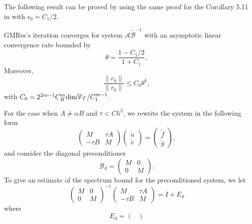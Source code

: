 \documentclass[smallcondensed]{svjour3}
\numberwithin{equation}{section} \numberwithin{table}{section}
\numberwithin{figure}{section}
\numberwithin{algorithm}{section}
\begin{document}
The following result can be proved by using the same proof for the Corollary 5.11 in \cite{bansch2011preconditioning} with $\epsilon_0 = C_1/2$.

\begin{corollary}
GMRes's iteration converges for system $\mathcal{A}\tilde{\mathcal{B}}^{-1}$ with an asymptotic linear convergence rate bounded by
$$
\theta = \frac{1-C_1/2}{1+C_1},
$$
 Moreover, 
$$
\frac{\|r_k\|}{\|r_0\|}\leq C_0\theta^k,
$$
with $C_0=2^{2m-1}C^m_R{\rm dim}\mathbb{V}_{\mathcal{T}}/C_1^{m-1}$. 
\end{corollary}

\begin{remark} \label{small-tau}
For the case when $A\neq \alpha B$ and $\tau< Ch^2$, we rewrite the system in the following form
\begin{equation}
\begin{pmatrix}
 M & \tau A\\
 -\tau B & M
\end{pmatrix}
\begin{pmatrix}
 \utilde{u}\\
 \utilde{v}
\end{pmatrix}
=
\begin{pmatrix}
 \utilde{f}\\
 \utilde{g}
\end{pmatrix},
\end{equation}
and consider the diagonal preconditioner
\begin{equation}\label{block-diagonal-preconditioner}
\mathcal{B}_d = 
\begin{pmatrix}
 M & 0\\
 0 & M
\end{pmatrix}.
\end{equation}
To give an estimate of the spectrum bound for the preconditioned system, we let
\begin{equation*}
\begin{pmatrix}
 M & 0\\
 0 & M
\end{pmatrix}^{-1}
\begin{pmatrix}
 M & \tau A\\
 -\tau B & M
\end{pmatrix}
= I +E_d
\end{equation*}
where
\begin{equation}
E_d = 
\begin{pmatrix}

\end{pmatrix}
\end{equation}
\end{remark}
\end{document}
